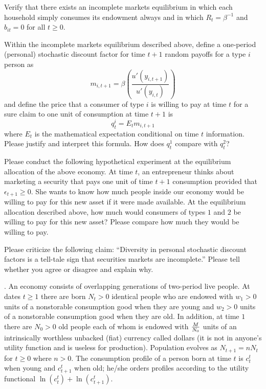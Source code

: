 \medskip
{}  Verify that there exists an incomplete markets  equilibrium in which each household simply consumes its endowment always and in which $R_t = \beta^{-1}$  and $b_{it} = 0$ for all $t \geq 0$.

\medskip
{} Within the incomplete markets equilibrium described above, define a one-period (personal) stochastic discount factor  for time $t+1$ random payoffs for a type $i$ person as
$$ m_{i,t+1} = \beta \left( {\frac{u'(y_{i,t+1})}{u'(y_{i,t})}} \right)  $$
and define the price that a consumer of type $i$ is willing to pay at time $t$ for a sure claim to one unit of  consumption at time $t+1$ is
$$ q^i_t = E_t m_{i,t+1} $$
where $E_t$ is the mathematical expectation conditional on time $t$ information. Please justify and interpret this formula. How does $q^1_t$ compare  with
$q^2_t$?

\medskip
{} Please conduct the following hypothetical experiment at the equilibrium allocation of the above economy.  At time
$t$, an entrepreneur thinks about marketing a security that pays one unit of time  $t+1$ consumption
provided that $\epsilon_{t+1} \geq 0$.  She wants to know how much people inside our economy would be willing to pay for this new asset if it were made available.  At the equilibrium allocation described above,
how much would consumers of types $1$ and $2$ be willing to pay for this new  asset?
Please compare how much they would be willing to pay.

\medskip
{} Please criticize the following claim: ``Diversity in personal stochastic discount factors is a tell-tale sign
that securities markets are incomplete.''  Please tell whether you agree or disagree and explain why.

\medskip

. An economy consists of overlapping generations of two-period live people. At dates $t \geq 1$ there are born
$N_t >0$ identical people who are endowed with $w_1 >0$ units of a nonstorable consumption good when they
are young and $w_2 >0 $ units of a nonstorable consumption good when they are old.  In addition, at time $1$ there
are $N_0> 0$ old people each of whom is endowed with ${M \over N_0}$ units of an intrinsically worthless unbacked (fiat) currency called
dollars (it is not in anyone's utility function and is useless for production).  
Population evolves as $N_{t+1} = n N_t$ for $t \geq 0$ where $n >0$.  The consumption profile
of a person born at time $t$ is $c_t^t$ when young and $c_{t+1}^t$ when old; he/she orders profiles according to the
utility functional
$ \ln (c_t^t) + \ln (c^t_{t+1}) .$

